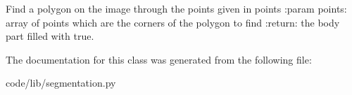 \begin{DoxyVerb}Find a polygon on the image through the points given in points
:param points: array of points which are the corners of the polygon to find
:return:  the body part filled with true.
\end{DoxyVerb}
 

The documentation for this class was generated from the following file\+:\begin{DoxyCompactItemize}
\item 
code/lib/segmentation.\+py\end{DoxyCompactItemize}

